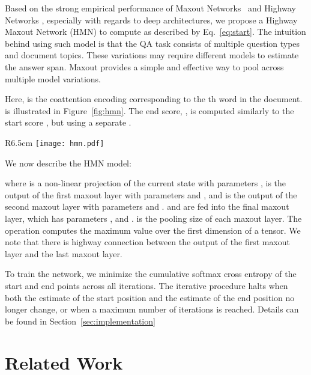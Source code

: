 \documentclass{article} \usepackage{iclr2017_conference,times}
\begin{document}
Based on the strong empirical performance of Maxout Networks~\citep{goodfellow2013maxout} and Highway Networks \citep{srivastava2015highway}, especially with regards to deep architectures, we propose a Highway Maxout Network (HMN) to compute  as described by Eq.~\ref{eq:start}.
The intuition behind using such model is that the QA task consists of multiple question types and document topics.
These variations may require different models to estimate the answer span.
Maxout provides a simple and effective way to pool across multiple model variations.



Here,  is the coattention encoding corresponding to the th word in the document.  is illustrated in Figure~\ref{fig:hmn}.
The end score, , is computed similarly to the start score , but using a separate .


\begin{wrapfigure}[19]{R}{6.5cm}
    \centering
	\texttt{[image: hmn.pdf]}
    \vspace{-0.5 cm}
	\caption{Highway Maxout Network. Dotted lines denote highway connections.} 
	\label{fig:hmn}
\end{wrapfigure}

We now describe the HMN model:



where  is a non-linear projection of the current state with parameters
,
 is the output of the first maxout layer with parameters
 and
,
and
 is the output of the second maxout layer with parameters
 and
.
 and  are fed into the final maxout layer, which has parameters
,
and
.
 is the pooling size of each maxout layer.
The  operation computes the maximum value over the first dimension of a tensor.
We note that there is highway connection between the output of the first maxout layer and the last maxout layer.

To train the network, we minimize the cumulative softmax cross entropy of the start and end points across all iterations.
The iterative procedure halts when both the estimate of the start position and the estimate of the end position no longer change, or when a maximum number of iterations is reached.
Details can be found in Section~\ref{sec:implementation}



\section{Related Work}
\end{document}
